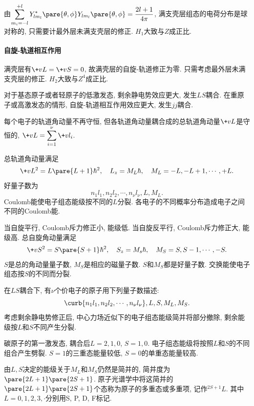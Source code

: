 \documentclass[hidelinks]{ctexart}
\begin{document}
由$\displaystyle \sum_{m_i = -l}^{+l} Y_{lm_l}^*\pare{\theta,\phi}Y_{lm_l}\pare{\theta,\phi} = \frac{2l+1}{4\pi}$, 满支壳层组态的电荷分布是球对称的, 只需要计最外层未满支壳层的修正. $H_1$大致与$Z$成正比.


\paragraph{自旋-轨道相互作用} %
\label{par:自旋_轨道相互作用}

满壳层有$\+vL = \+vS = 0$, 故满壳层的自旋-轨道修正为零. 只需考虑最外层未满支壳层的修正. $H_2$大致与$Z^4$成正比.


\par
对于基态原子或者轻原子的低激发态, 剩余静电势效应更大, 发生$LS$耦合. 在重原子或高激发态的情形, 自旋-轨道相互作用效应更大, 发生$jj$耦合.


\label{ssub:ls耦合情形}

每个电子的轨道角动量不再守恒, 但各轨道角动量耦合成的总轨道角动量$\+vL$是守恒的, $\displaystyle \+vL = \sum_{i=1}^\nu \+vl_i$.
\par
总轨道角动量满足
\[ \+vL^2 = L\pare{L+1}\hbar^2,\quad L_z = M_L \hbar,\quad M_L = -L,-L+1,\cdots,+L. \]
好量子数为
\[ n_1l_1, n_2l_2, \cdots, n_\nu l_\nu,L,M_L. \]
Coulomb能使电子组态能级按不同的$L$分裂. 各电子的不同概率分布造成电子之间不同的Coulomb能.

\par
当自旋平行, Coulomb斥力修正小, 能级低. 当自旋反平行, Coulomb斥力修正大, 能级高. 总自旋角动量满足
\[ \+vS^2 = S\pare{S+1}\hbar^2,\quad S_z = M_s \hbar,\quad M_S = S,S-1,\cdots,-S. \]
$S$是总的角动量量子数, $M_S$是相应的磁量子数. $S$和$M_S$都是好量子数. 交换能使电子组态按$S$的不同而分裂.
\par
在$LS$耦合下, 有$\nu$个价电子的原子用下列量子数描述:
\[ \curb{n_1l_1,n_2l_2,\cdots,n_\nu l_\nu},L,S,M_L,M_S. \]
考虑剩余静电势修正后, 中心力场近似下的电子组态能级简并将部分撤除, 剩余能级按$L$和$S$不同产生分裂.
\begin{ex}
    碳原子的第一激发态, 耦合后$L = 2,1,0$, $S = 1,0$. 电子组态能级将按照$L$和$S$的不同组合产生劈裂. $S=1$的三重态能量较低, $S=0$的单重态能量较高.
\end{ex}
由$L,S$决定的能级关于$M_L$和$M_S$仍然是简并的, 简并度为$\pare{2L+1}\pare{2S+1}$. 原子光谱学中将这简并的$\pare{2L+1}\pare{2S+1}$个态称为原子的多重态或多重项, 记作$^{2S+1}L$. 其中$L=0,1,2,3,\cdot$分别用S, P, D, F标记.
\end{document}
